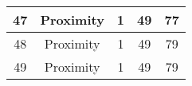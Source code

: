 \documentclass[results.tex]{subfiles}
\begin{document}
\begin{center}
\begin{tabular}{| c || c | c | c | c |}
            \hline
            47                      & Proximity                    & 1                      & 49                      & 77                   \\
            \hline
            48                      & Proximity                    & 1                      & 49                      & 79                   \\
            \hline
            49                      & Proximity                    & 1                      & 49                      & 79                   \\
            \hline
        \end{tabular}
    \end{center}
\end{document}
